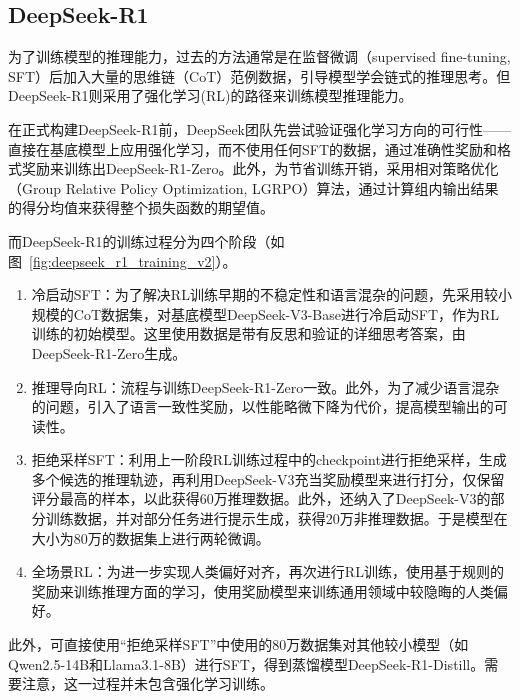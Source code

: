 \subsection{DeepSeek-R1}

为了训练模型的推理能力，过去的方法通常是在监督微调（supervised fine-tuning, SFT）后加入大量的思维链（CoT）范例数据，引导模型学会链式的推理思考。但DeepSeek-R1则采用了强化学习(RL)的路径来训练模型推理能力。

在正式构建DeepSeek-R1前，DeepSeek团队先尝试验证强化学习方向的可行性——直接在基底模型上应用强化学习，而不使用任何SFT的数据，通过准确性奖励和格式奖励来训练出DeepSeek-R1-Zero。此外，为节省训练开销，采用相对策略优化（Group Relative Policy Optimization, LGRPO）算法，通过计算组内输出结果的得分均值来获得整个损失函数的期望值。

而DeepSeek-R1的训练过程分为四个阶段（如图~\ref{fig:deepseek_r1_training_v2}）。
\begin{enumerate}
    \item 冷启动SFT：为了解决RL训练早期的不稳定性和语言混杂的问题，先采用较小规模的CoT数据集，对基底模型DeepSeek-V3-Base进行冷启动SFT，作为RL训练的初始模型。这里使用数据是带有反思和验证的详细思考答案，由DeepSeek-R1-Zero生成。
    \item 推理导向RL：流程与训练DeepSeek-R1-Zero一致。此外，为了减少语言混杂的问题，引入了语言一致性奖励，以性能略微下降为代价，提高模型输出的可读性。
    \item 拒绝采样SFT：利用上一阶段RL训练过程中的checkpoint进行拒绝采样，生成多个候选的推理轨迹，再利用DeepSeek-V3充当奖励模型来进行打分，仅保留评分最高的样本，以此获得60万推理数据。此外，还纳入了DeepSeek-V3的部分训练数据，并对部分任务进行提示生成，获得20万非推理数据。于是模型在大小为80万的数据集上进行两轮微调。
    \item 全场景RL：为进一步实现人类偏好对齐，再次进行RL训练，使用基于规则的奖励来训练推理方面的学习，使用奖励模型来训练通用领域中较隐晦的人类偏好。
\end{enumerate}

此外，可直接使用“拒绝采样SFT”中使用的80万数据集对其他较小模型（如Qwen2.5-14B和Llama3.1-8B）进行SFT，得到蒸馏模型DeepSeek-R1-Distill。需要注意，这一过程并未包含强化学习训练。

